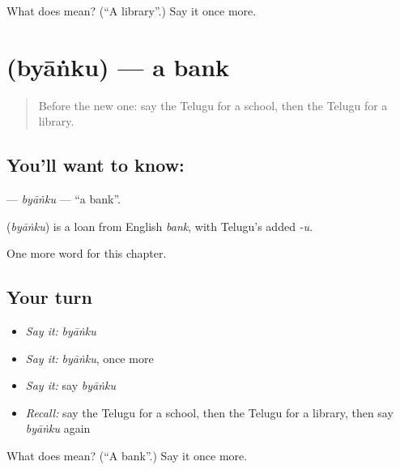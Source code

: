 \begin{tcolorbox}[breakable,colback=teal!4,colframe=teal!35!black,title={Before you move on}]
What does  mean? (\textquotedblleft{}A library\textquotedblright{}.) Say it once more.
\end{tcolorbox}
\section[\texorpdfstring{\te{బ్యాంకు} (byāṅku)}{బ్యాంకు (byāṅku)}]{ (byāṅku) — a bank}

\label{lesson:TE-C103-byanku}



\begin{quote}
Before the new one: say the Telugu for a school, then the Telugu for a library.
\end{quote}

\subsection*{You'll want to know: }
\textbf{} — \emph{byāṅku} — \textquotedblleft{}a bank\textquotedblright{}.

\begin{cousinweb}
\textbf{} (\emph{byāṅku}) is a loan from English \emph{bank}, with Telugu's added \emph{-u}.
\end{cousinweb}

\begin{grammarlens}[title={What you've built}]
One more word for this chapter.
\end{grammarlens}

\subsection*{Your turn}
\begin{itemize}
\raggedright
  \item \emph{Say it:} \emph{byāṅku}
  \item \emph{Say it:} \emph{byāṅku}, once more
  \item \emph{Say it:} say \emph{byāṅku}
  \item \emph{Recall:} say the Telugu for a school, then the Telugu for a library, then say \emph{byāṅku} again
\end{itemize}

\begin{tcolorbox}[breakable,colback=teal!4,colframe=teal!35!black,title={Before you move on}]
What does  mean? (\textquotedblleft{}A bank\textquotedblright{}.) Say it once more.
\end{tcolorbox}
